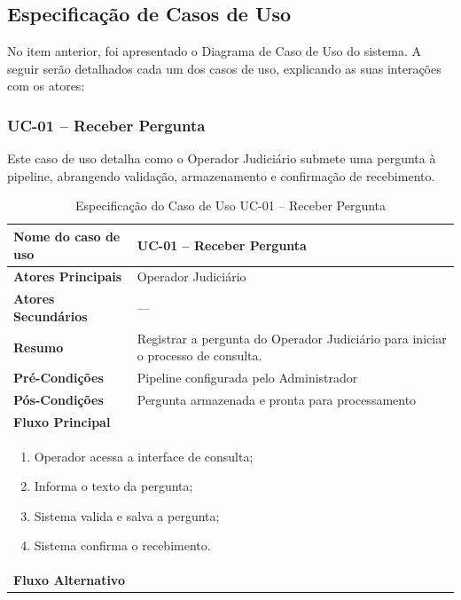 \begin{description}
\subsection{Especificação de Casos de Uso}
\label{sec:especificacao-casos-uso}
No item anterior, foi apresentado o Diagrama de Caso de Uso do sistema. 
A seguir serão detalhados cada um dos casos de uso, explicando as suas interações 
com os atores:

\subsubsection{UC-01 – Receber Pergunta}
\noindent Este caso de uso detalha como o Operador Judiciário submete uma pergunta à pipeline, abrangendo validação, armazenamento e confirmação de recebimento.
\begin{table}[H]
  \centering
  \caption{Especificação do Caso de Uso UC-01 – Receber Pergunta}
  \label{tab:uc01}
  \begin{tabular}{|p{4cm}|p{11cm}|}
    \hline
    \textbf{Nome do caso de uso}    & UC-01 – Receber Pergunta \\ \hline
    \textbf{Atores Principais}      & Operador Judiciário      \\ \hline
    \textbf{Atores Secundários}     & —                        \\ \hline
    \textbf{Resumo}                 & Registrar a pergunta do Operador Judiciário para iniciar o processo de consulta. \\ \hline
    \textbf{Pré-Condições}          & Pipeline configurada pelo Administrador \\ \hline
    \textbf{Pós-Condições}          & Pergunta armazenada e pronta para processamento \\ \hline
    \multicolumn{2}{|l|}{\textbf{Fluxo Principal}} \\ \hline
    \multicolumn{2}{|p{15cm}|}{%
      \begin{enumerate}[label=\arabic*., leftmargin=*]
        \item Operador acessa a interface de consulta;
        \item Informa o texto da pergunta;
        \item Sistema valida e salva a pergunta;
        \item Sistema confirma o recebimento.
      \end{enumerate}
    } \\ \hline
    \multicolumn{2}{|l|}{\textbf{Fluxo Alternativo}} \\ \hline

\end{tabular}
\end{table}
\end{description}
